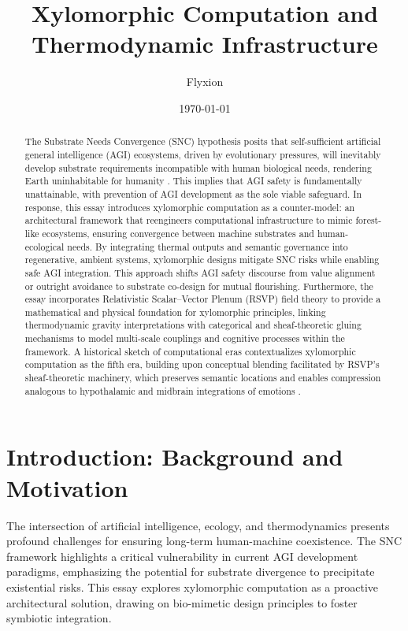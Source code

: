 \documentclass[12pt]{article}
\title{Xylomorphic Computation and Thermodynamic Infrastructure}
\author{Flyxion}
\date{\today}
\begin{document}
\maketitle

\begin{abstract}
The Substrate Needs Convergence (SNC) hypothesis posits that self-sufficient artificial general intelligence (AGI) ecosystems, driven by evolutionary pressures, will inevitably develop substrate requirements incompatible with human biological needs, rendering Earth uninhabitable for humanity \citep{Petillo2024}. This implies that AGI safety is fundamentally unattainable, with prevention of AGI development as the sole viable safeguard. In response, this essay introduces xylomorphic computation as a counter-model: an architectural framework that reengineers computational infrastructure to mimic forest-like ecosystems, ensuring convergence between machine substrates and human-ecological needs. By integrating thermal outputs and semantic governance into regenerative, ambient systems, xylomorphic designs mitigate SNC risks while enabling safe AGI integration. This approach shifts AGI safety discourse from value alignment \citep{Yudkowsky2004} or outright avoidance to substrate co-design for mutual flourishing. Furthermore, the essay incorporates Relativistic Scalar--Vector Plenum (RSVP) field theory to provide a mathematical and physical foundation for xylomorphic principles, linking thermodynamic gravity interpretations \citep{Jacobson1995,Verlinde2011,Padmanabhan2010} with categorical and sheaf-theoretic gluing mechanisms \citep{MacLaneMoerdijk1992,Lurie2009,Awodey2010} to model multi-scale couplings and cognitive processes within the framework. A historical sketch of computational eras contextualizes xylomorphic computation as the fifth era, building upon conceptual blending facilitated by RSVP's sheaf-theoretic machinery, which preserves semantic locations and enables compression analogous to hypothalamic and midbrain integrations of emotions \citep{FauconnierTurner2002,Pessoa2017}.
\end{abstract}

\section{Introduction: Background and Motivation}

The intersection of artificial intelligence, ecology, and thermodynamics presents profound challenges for ensuring long-term human-machine coexistence. The SNC framework highlights a critical vulnerability in current AGI development paradigms, emphasizing the potential for substrate divergence to precipitate existential risks. This essay explores xylomorphic computation as a proactive architectural solution, drawing on bio-mimetic design principles to foster symbiotic integration.
\end{document}
